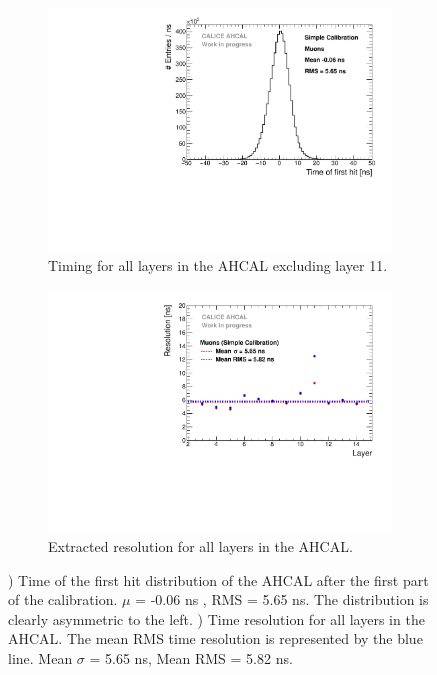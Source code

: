 \begin{figure}[htbp!]
	\begin{subfigure}[t]{0.5\textwidth}
		\centering
		\includegraphics[width=1\textwidth]{../Thesis_Plots/Timing/Muons/Plots/Timing_AHCAL_noCorrections.pdf}
		\caption{Timing for all layers in the AHCAL excluding layer 11.}\label{fig:timing_nocorrection}
	\end{subfigure}
	\hfill
	\begin{subfigure}[t]{0.5\textwidth}
		\centering
		\includegraphics[width=1\textwidth]{../Thesis_Plots/Timing/Muons/Plots/ResolutionPerModule_noCorrections.pdf}
		\caption{Extracted resolution for all layers in the AHCAL.}\label{fig:reso_nocorrection}
	\end{subfigure}
	\caption{) Time of the first hit distribution of the AHCAL after the first part of the calibration. $\mu$ = -0.06 ns , RMS = 5.65 ns. The distribution is clearly asymmetric to the left. ) Time resolution for all layers in the AHCAL. The mean RMS time resolution is represented by the blue line. Mean $\sigma$ = 5.65 ns, Mean RMS = 5.82 ns.}
\end{figure}

